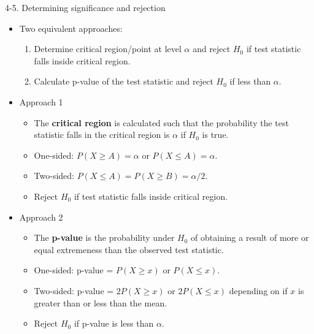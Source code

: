 \documentclass[10pt, handout, xcolor=table]{beamer}
\begin{document}
\begin{frame}{4-5. Determining significance and rejection}

\begin{itemize}
\item Two equivalent approaches:
\begin{enumerate}
\item Determine critical region/point at level $\alpha$ and reject $H_0$ if test statistic falls inside critical region.
\item Calculate p-value of the test statistic and reject $H_0$ if less than $\alpha$.
\end{enumerate}
\item Approach 1
\begin{itemize}
\item The \textbf{critical region} is calculated such that the probability the test statistic falls in the critical region is $\alpha$ if $H_0$ is true.
\item One-sided: $P(X \geq A) = \alpha$ or $P(X \leq A) = \alpha$.
\item[] Two-sided: $P(X \leq A) = P(X \geq B) = \alpha/2$.
\item Reject $H_0$ if test statistic falls inside critical region.
\end{itemize}
\item Approach 2
\begin{itemize}
\item The \textbf{p-value} is the probability under $H_0$ of obtaining a result of more or equal extremeness than the observed test statistic.
\item One-sided: p-value = $P(X \geq x)$ or $P(X \leq x)$.
\item[] Two-sided: p-value = $2P(X \geq x)$ or $2P(X \leq x)$ depending on if $x$ is greater than or less than the mean.
\item Reject $H_0$ if p-value is less than $\alpha$.
\end{itemize}
\end{itemize}

\end{frame}
\end{document}
